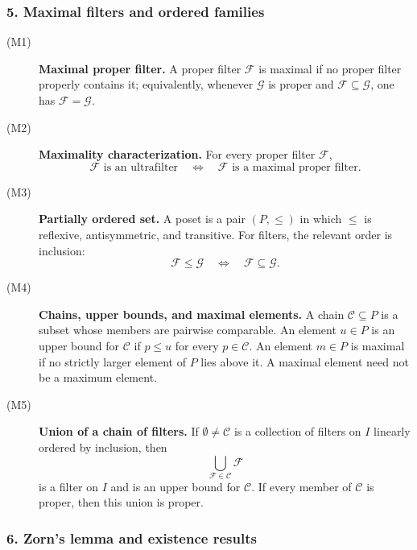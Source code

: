 {\subsubsection*{5. Maximal filters and ordered families}

\begin{description}
    \item[\textnormal{(M1)}] \textbf{Maximal proper filter.}
    A proper filter \(\mathcal{F}\) is maximal if no proper filter properly
    contains it; equivalently, whenever \(\mathcal{G}\) is proper and
    \(\mathcal{F}\subseteq\mathcal{G}\), one has
    \(\mathcal{F}=\mathcal{G}\).

    \item[\textnormal{(M2)}] \textbf{Maximality characterization.}
    For every proper filter \(\mathcal{F}\),
    \[
    \mathcal{F}\text{ is an ultrafilter}
    \quad\Longleftrightarrow\quad
    \mathcal{F}\text{ is a maximal proper filter}.
    \]

    \item[\textnormal{(M3)}] \textbf{Partially ordered set.}
    A poset is a pair \((P,\leq)\) in which \(\leq\) is reflexive,
    antisymmetric, and transitive. For filters, the relevant order is
    inclusion:
    \[
    \mathcal{F}\leq\mathcal{G}
    \quad\Longleftrightarrow\quad
    \mathcal{F}\subseteq\mathcal{G}.
    \]

    \item[\textnormal{(M4)}] \textbf{Chains, upper bounds, and maximal elements.}
    A chain \(\mathcal{C}\subseteq P\) is a subset whose members are
    pairwise comparable. An element \(u\in P\) is an upper bound for
    \(\mathcal{C}\) if \(p\leq u\) for every \(p\in\mathcal{C}\). An
    element \(m\in P\) is maximal if no strictly larger element of \(P\)
    lies above it. A maximal element need not be a maximum element.

    \item[\textnormal{(M5)}] \textbf{Union of a chain of filters.}
    If \(\emptyset\neq\mathcal{C}\) is a collection of filters on \(I\)
    linearly ordered by inclusion, then
    \[
    \bigcup_{\mathcal{F}\in\mathcal{C}}\mathcal{F}
    \]
    is a filter on \(I\) and is an upper bound for \(\mathcal{C}\). If
    every member of \(\mathcal{C}\) is proper, then this union is proper.
\end{description}

\subsubsection*{6. Zorn's lemma and existence results}

}
